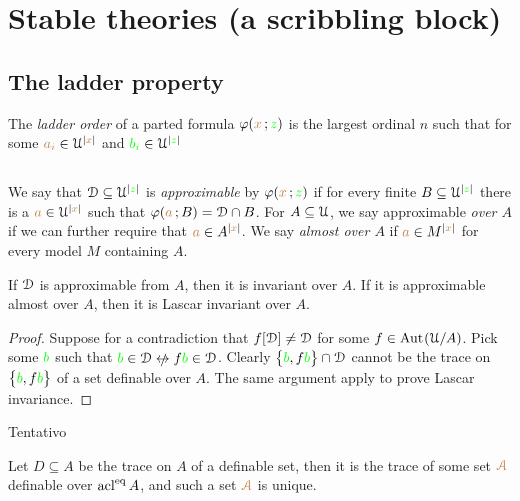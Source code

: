 \documentclass[creche.tex]{subfiles}
\begin{document}
\chapter{Stable theories (a scribbling block)}
\label{stability}
 
\def\medrel#1{\parbox[t]{6ex}{$\displaystyle\hfil #1$}}
\def\ceq#1#2#3{\parbox{25ex}{$\displaystyle #1$}\medrel{#2}$\displaystyle  #3$}

\section{The ladder property}

The \emph{ladder order\/} of a parted formula $\varphi({\color{brown} x}\,;{\color{green} z})$ is the largest ordinal $n$ such that for some ${\color{brown} a_i}\in\EuScript U^{|{\color{brown} x}|}$ and ${\color{green} b_i}\in\EuScript U^{|{\color{green} z}|}$ 


\section{}

We say that $\EuScript D\subseteq\EuScript U^{|{\color{green} z}|}$ is \emph{approximable\/} by $\varphi({\color{brown} x}\,;{\color{green} z})$ if for every finite $B\subseteq\EuScript U^{|{\color{green} z}|}$ there is a ${\color{brown} a}\in\EuScript U^{|{\color{brown} x}|}$ such that $\varphi({\color{brown} a}\,;B)=\EuScript D\cap B$. For $A\subseteq\EuScript U$, we say approximable \emph{over $A$\/} if we can further require that ${\color{brown} a}\in A^{|{\color{brown} x}|}$. We say \emph{almost over $A$\/} if  ${\color{brown} a}\in M^{|{\color{brown} x}|}$ for every model $M$ containing $A$.

\begin{proposition}
If\/ $\EuScript D$ is\/ approximable from $A$, then it is invariant over $A$. If it is\/ ap\-prox\-i\-ma\-ble almost over $A$, then it is Lascar invariant over $A$.
\end{proposition}

\begin{proof}
Suppose for a contradiction that $f[\EuScript D]\neq\EuScript D$ for some $f\in\textrm{Aut\kern.15ex}(\EuScript U/A)$. Pick some ${\color{green} b}$ such that ${\gr b}\in\D\niff f{\gr b}\in\D$. Clearly $\big\{{\color{green} b},f{\color{green} b}\big\}\cap\EuScript D$ cannot be the trace on $\big\{{\color{green} b},f{\color{green} b}\big\}$ of a set definable over $A$. The same argument apply to prove Lascar invariance.
\end{proof}

Tentativo

Let $D\subseteq A$ be the trace on $A$ of a definable set, then it is the trace of some set ${\color{brown}{\EuScript A}}$ definable over $\mathop{\rm acl}^{{\rm eq}} A$, and such a set ${\color{brown}{\EuScript A}}$ is unique.
\end{document}

